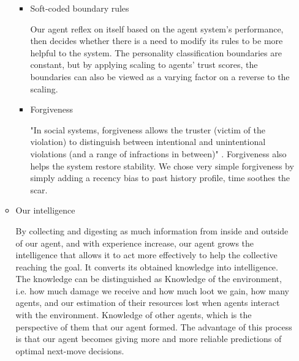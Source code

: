\begin{itemize}
\begin{itemize}
\begin{itemize}
\begin{flushleft}
                    \end{flushleft}
                \item Soft-coded boundary rules
                    \begin{flushleft}
                    \setlength{\parindent}{2em}
                    Our agent reflex on itself based on the agent system's performance, then decides whether there is a need to modify its rules to be more helpful to the system. The personality classification boundaries are constant, but by applying scaling to agents' trust scores, the boundaries can also be viewed as a varying factor on a reverse to the scaling. 
                    \end{flushleft}                
                \item Forgiveness
                    \begin{flushleft}
                    \setlength{\parindent}{2em}
                    "In social systems, forgiveness allows the truster (victim of the violation) to distinguish between intentional and unintentional violations (and a range of infractions in between)" \cite{pitt}. Forgiveness also helps the system restore stability. We chose very simple forgiveness by simply adding a recency bias to past history profile, time soothes the scar.

                    \end{flushleft}                
            \end{itemize}
        \item Our intelligence 
            \begin{flushleft}
            \setlength{\parindent}{2em}
            By collecting and digesting as much information from inside and outside of our agent, and with experience increase, our agent grows the intelligence that allows it to act more effectively to help the collective reaching the goal. It converts its obtained knowledge into intelligence. The knowledge can be distinguished as Knowledge of the environment, i.e. how much damage we receive and how much loot we gain, how many agents, and our estimation of their resources lost when agents interact with the environment. Knowledge of other agents, which is the perspective of them that our agent formed.  The advantage of this process is that our agent becomes giving more and more reliable predictions of optimal next-move decisions.

            \end{flushleft}        
    \end{itemize}


\end{itemize}
